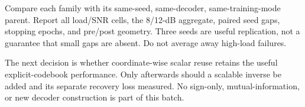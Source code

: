 \documentclass[11pt]{article}
\begin{document}
Compare each family with its same-seed, same-decoder, same-training-mode parent. Report all load/SNR cells,
the 8/12-dB aggregate, paired seed gaps, stopping epochs, and pre/post geometry.
Three seeds are useful replication, not a guarantee that small gaps are absent. Do not average away high-load failures.


The next decision is whether coordinate-wise scalar reuse retains the useful explicit-codebook performance.
Only afterwards should a scalable inverse be added and its separate recovery loss measured.
No sign-only, mutual-information, or new decoder construction is part of this batch.
\end{document}
